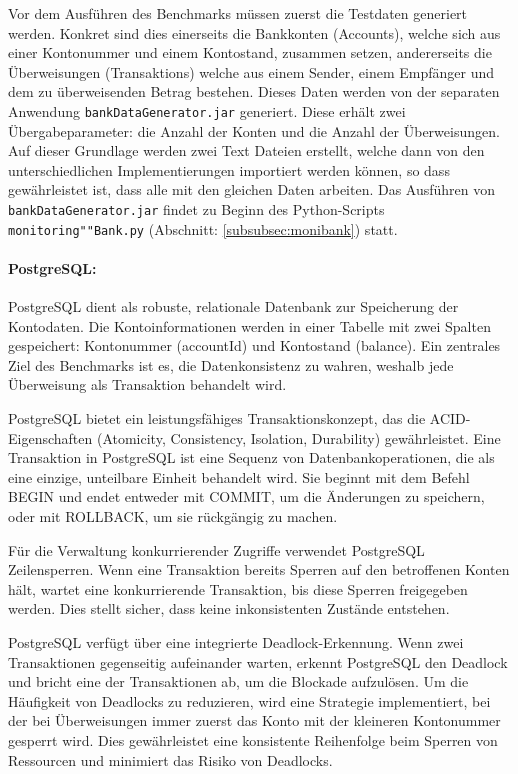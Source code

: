 \documentclass[fontsize=12pt,paper=a4,twoside=semi,parskip=half-,headsepline,headinclude]{scrreprt}
\begin{document}
 Vor dem Ausführen des Benchmarks müssen zuerst die Testdaten generiert werden. Konkret sind dies einerseits die Bankkonten (Accounts), welche sich aus einer Kontonummer und einem Kontostand, zusammen setzen, andererseits die Überweisungen (Transaktions) welche aus einem Sender, einem Empfänger und dem zu überweisenden Betrag bestehen. Dieses Daten werden von der separaten Anwendung \texttt{bankDataGenerator.jar} generiert. Diese erhält zwei Übergabeparameter: die Anzahl der Konten und die Anzahl der Überweisungen. Auf dieser Grundlage werden zwei Text Dateien erstellt, welche dann von den unterschiedlichen Implementierungen importiert werden können, so dass gewährleistet ist, dass alle mit den gleichen Daten arbeiten. Das Ausführen von \texttt{bankDataGenerator.jar} findet zu Beginn des Python-Scripts \texttt{monitoring""Bank.py} (Abschnitt: \ref{subsubsec:monibank}) statt.
 
\paragraph{PostgreSQL:}

PostgreSQL dient als robuste, relationale Datenbank zur Speicherung der Kontodaten. Die Kontoinformationen werden in einer Tabelle mit zwei Spalten gespeichert: Kontonummer (accountId) und Kontostand (balance). Ein zentrales Ziel des Benchmarks ist es, die Datenkonsistenz zu wahren, weshalb jede Überweisung als Transaktion behandelt wird.

PostgreSQL bietet ein leistungsfähiges Transaktionskonzept, das die ACID-Eigenschaften (Atomicity, Consistency, Isolation, Durability) gewährleistet. Eine Transaktion in PostgreSQL ist eine Sequenz von Datenbankoperationen, die als eine einzige, unteilbare Einheit behandelt wird. Sie beginnt mit dem Befehl BEGIN und endet entweder mit COMMIT, um die Änderungen zu speichern, oder mit ROLLBACK, um sie rückgängig zu machen.

Für die Verwaltung konkurrierender Zugriffe verwendet PostgreSQL Zeilensperren. Wenn eine Transaktion bereits Sperren auf den betroffenen Konten hält, wartet eine konkurrierende Transaktion, bis diese Sperren freigegeben werden. Dies stellt sicher, dass keine inkonsistenten Zustände entstehen.

PostgreSQL verfügt über eine integrierte Deadlock-Erkennung. Wenn zwei Transaktionen gegenseitig aufeinander warten, erkennt PostgreSQL den Deadlock und bricht eine der Transaktionen ab, um die Blockade aufzulösen.
Um die Häufigkeit von Deadlocks zu reduzieren, wird eine Strategie implementiert, bei der bei Überweisungen immer zuerst das Konto mit der kleineren Kontonummer gesperrt wird. Dies gewährleistet eine konsistente Reihenfolge beim Sperren von Ressourcen und minimiert das Risiko von Deadlocks.
\end{document}
